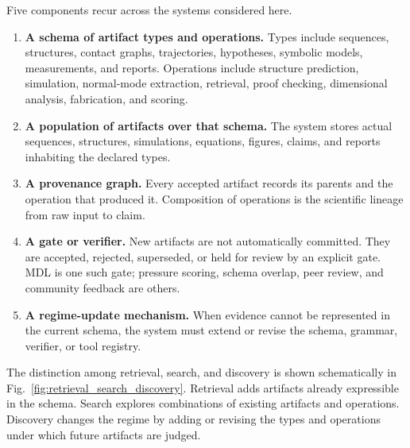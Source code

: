 \documentclass[11pt]{article}
\theoremstyle{definition}
\begin{document}
Five components recur across the systems considered here.
\begin{enumerate}[leftmargin=1.7em]
    \item \textbf{A schema of artifact types and operations.} Types include sequences, structures, contact graphs, trajectories, hypotheses, symbolic models, measurements, and reports. Operations include structure prediction, simulation, normal-mode extraction, retrieval, proof checking, dimensional analysis, fabrication, and scoring.
    \item \textbf{A population of artifacts over that schema.} The system stores actual sequences, structures, simulations, equations, figures, claims, and reports inhabiting the declared types.
    \item \textbf{A provenance graph.} Every accepted artifact records its parents and the operation that produced it. Composition of operations is the scientific lineage from raw input to claim.
    \item \textbf{A gate or verifier.} New artifacts are not automatically committed. They are accepted, rejected, superseded, or held for review by an explicit gate. MDL is one such gate; pressure scoring, schema overlap, peer review, and community feedback are others.
    \item \textbf{A regime-update mechanism.} When evidence cannot be represented in the current schema, the system must extend or revise the schema, grammar, verifier, or tool registry.
\end{enumerate}

The distinction among retrieval, search, and discovery is shown schematically in Fig.~\ref{fig:retrieval_search_discovery}. Retrieval adds artifacts already expressible in the schema. Search explores combinations of existing artifacts and operations. Discovery changes the regime by adding or revising the types and operations under which future artifacts are judged.
\end{document}
